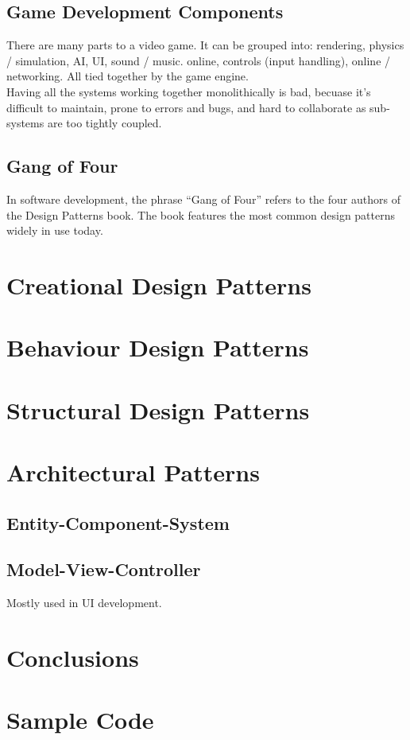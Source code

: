\documentclass[10pt,letterpaper]{article}
\begin{document}
\subsection{Game Development Components}

There are many parts to a video game. It can be grouped into: rendering, physics / simulation, AI, UI, sound / music. online, controls (input handling), online / networking. All tied together by the game engine.\\

Having all the systems working together monolithically is bad, becuase it's difficult to maintain, prone to errors and bugs, and hard to collaborate as sub-systems are too tightly coupled.\\


\subsection{Gang of Four}

In software development, the phrase ``Gang of Four'' refers to the four authors of the Design Patterns book. The book features the most common design patterns widely in use today.\\




\section{Creational Design Patterns}

\section{Behaviour Design Patterns}

\section{Structural Design Patterns}

\section{Architectural Patterns}

\subsection{Entity-Component-System}

\subsection{Model-View-Controller}

Mostly used in UI development. 

\section{Conclusions}

\clearpage
{}



\clearpage
\appendix
\section{Sample Code}

\end{document}
